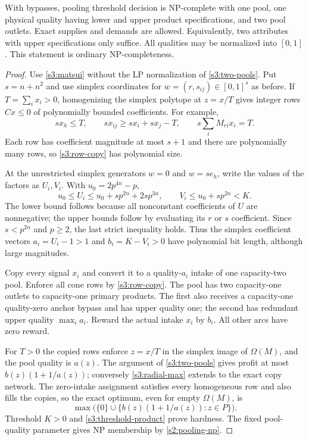 \begin{theorem}\label{s3:base-bypass}
With bypasses, pooling threshold decision is NP-complete with one pool,
one physical quality having lower and upper product specifications, and
two pool outlets. Exact supplies and demands are allowed. Equivalently,
two attributes with upper specifications only suffice. All qualities may
be normalized into $[0,1]$. This statement is ordinary NP-completeness.
\end{theorem}
\begin{proof}
Use \cref{s3:matsui} without the LP normalization of
\cref{s3:two-pools}. Put $s=n+n^2$ and use simplex coordinates for
$w=(r,s_{ij})\in[0,1]^s$ as before. If $T=\sum_i x_i>0$, homogenizing
the simplex polytope at $z=x/T$ gives integer rows $Cx\le0$ of
polynomially bounded coefficients. For example,
\[
 sx_h\le T,\qquad sx_{ij}\ge sx_i+sx_j-T,
 \qquad s\sum_i M_{ri}x_i=T.
\]
Each row has coefficient magnitude at most $s+1$ and there are
polynomially many rows, so \cref{s3:row-copy} has polynomial size.

At the unrestricted simplex generators $w=0$ and $w=se_h$, write the
values of the factors as $U_i,V_i$. With $u_0=2p^{4n}-p$,
\begin{equation}
 u_0\le U_i\le u_0+sp^{2n}+2sp^{3n},\qquad
 V_i\le u_0+sp^{2n}<K.\label{s3:generator-bounds}
\end{equation}
The lower bound follows because all nonconstant coefficients of $U$
are nonnegative; the upper bounds follow by evaluating its $r$ or $s$
coefficient. Since $s<p^{2n}$ and $p\ge2$, the last strict inequality
holds. Thus the simplex coefficient vectors
$a_i=U_i-1>1$ and $b_i=K-V_i>0$ have polynomial bit length, although
large magnitudes.

Copy every signal $x_i$ and convert it to a quality-$a_i$ intake of
one capacity-two pool. Enforce all cone rows by \cref{s3:row-copy}.
The pool has two capacity-one outlets to capacity-one primary products.
The first also receives a capacity-one quality-zero anchor bypass and
has upper quality one; the second has redundant upper quality
$\max_i a_i$. Reward the actual intake $x_i$ by $b_i$. All other
arcs have zero reward.

For $T>0$ the copied rows enforce $z=x/T$ in the simplex image of
$\Omega(M)$, and the pool quality is $a(z)$. The argument of
\cref{s3:two-pools} gives profit at most $b(z)(1+1/a(z))$; conversely
\eqref{s3:radial-max} extends to the exact copy network. The zero-intake
assignment satisfies every homogeneous row and also fills the copies,
so the exact optimum, even for empty $\Omega(M)$, is
\begin{equation}
 \max\bigl(\{0\}\cup
 \{b(z)(1+1/a(z)):z\in P\}\bigr).\label{s3:copy-value}
\end{equation}
Threshold $K>0$ and \eqref{s3:threshold-product} prove hardness.
The fixed pool-quality parameter gives NP membership by
\cref{s2:pooling-np}.


\end{proof}
